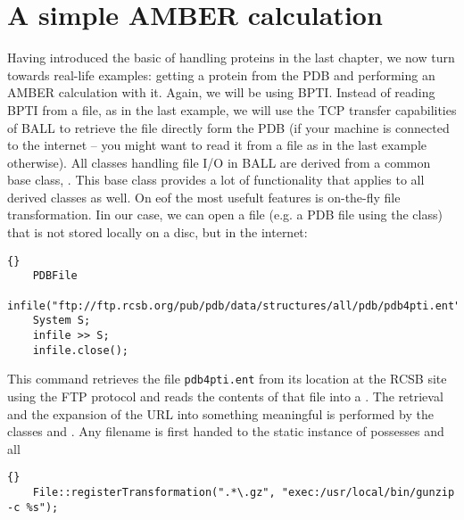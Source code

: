 \section{A simple AMBER calculation}

Having introduced the basic of handling proteins in the last
chapter, we now turn towards real-life examples: getting a protein
from the PDB and performing an AMBER calculation with it.
Again, we will be using BPTI. Instead of reading BPTI from a 
file, as in the last example, we will use the TCP transfer
capabilities of BALL to retrieve the file directly form the 
PDB (if your machine is connected to the internet -- you might
want to read it from a file as in the last example otherwise).
All classes handling file I/O in BALL are derived from a common
base class, . This base class provides a lot of
functionality that applies to all derived classes as well.
On eof the most usefult features is on-the-fly file transformation.
Iin our case, we can open a file (e.g. a PDB file using the  
class) that is not stored locally on a disc, but in the internet:

\begin{lstlisting}{}
	PDBFile
	infile("ftp://ftp.rcsb.org/pub/pdb/data/structures/all/pdb/pdb4pti.ent");
	System S;
	infile >> S;
	infile.close();
\end{lstlisting}

\noindent
This command retrieves the file {\tt pdb4pti.ent} from its location at the RCSB
site using the FTP protocol and reads the contents of that file into a
. The retrieval and the expansion of the URL into something
meaningful is performed by the classes  and
. Any filename is first handed to the static instance of
  possesses and all 

\begin{lstlisting}{}
	File::registerTransformation(".*\.gz", "exec:/usr/local/bin/gunzip -c %s");
\end{lstlisting}

\noindent
